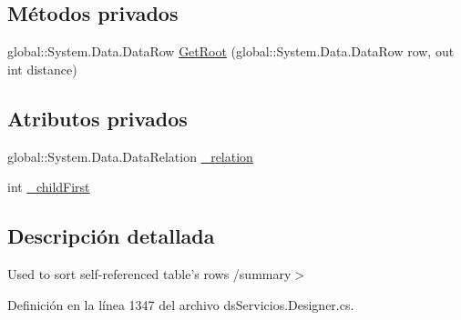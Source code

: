\subsection*{Métodos privados}
\begin{DoxyCompactItemize}
\item 
global\-::\-System.\-Data.\-Data\-Row \hyperlink{class_proyecto___integrador__3_1_1ds_servicios_table_adapters_1_1_table_adapter_manager_1_1_self_reference_comparer_a9bf53ee3bb97ad3fc23f5d885290e9b4}{Get\-Root} (global\-::\-System.\-Data.\-Data\-Row row, out int distance)
\end{DoxyCompactItemize}
\subsection*{Atributos privados}
\begin{DoxyCompactItemize}
\item 
global\-::\-System.\-Data.\-Data\-Relation \hyperlink{class_proyecto___integrador__3_1_1ds_servicios_table_adapters_1_1_table_adapter_manager_1_1_self_reference_comparer_a88115b67b87d4305d472d5fa124304b0}{\-\_\-relation}
\item 
int \hyperlink{class_proyecto___integrador__3_1_1ds_servicios_table_adapters_1_1_table_adapter_manager_1_1_self_reference_comparer_abf5fed6c245e5ee78cd5472bac96e77e}{\-\_\-child\-First}
\end{DoxyCompactItemize}


\subsection{Descripción detallada}
Used to sort self-\/referenced table's rows /summary$>$ 

Definición en la línea 1347 del archivo ds\-Servicios.\-Designer.\-cs.



